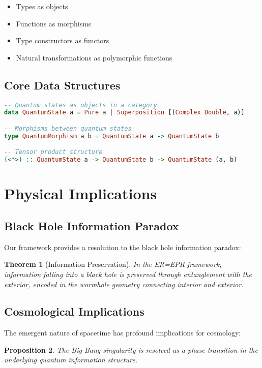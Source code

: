 \documentclass[11pt,a4paper]{article}
\newtheorem{theorem}{Theorem}[section]
\newtheorem{proposition}[theorem]{Proposition}
\begin{document}
\begin{itemize}
\item Types as objects
\item Functions as morphisms
\item Type constructors as functors
\item Natural transformations as polymorphic functions
\end{itemize}

\subsection{Core Data Structures}

\begin{lstlisting}[language=Haskell]
-- Quantum states as objects in a category
data QuantumState a = Pure a | Superposition [(Complex Double, a)]

-- Morphisms between quantum states
type QuantumMorphism a b = QuantumState a -> QuantumState b

-- Tensor product structure
(<*>) :: QuantumState a -> QuantumState b -> QuantumState (a, b)
\end{lstlisting}

\section{Physical Implications}

\subsection{Black Hole Information Paradox}

Our framework provides a resolution to the black hole information paradox:

\begin{theorem}[Information Preservation]
In the ER=EPR framework, information falling into a black hole is preserved through entanglement with the exterior, encoded in the wormhole geometry connecting interior and exterior.
\end{theorem}

\subsection{Cosmological Implications}

The emergent nature of spacetime has profound implications for cosmology:

\begin{proposition}
The Big Bang singularity is resolved as a phase transition in the underlying quantum information structure.
\end{proposition}
\end{document}
